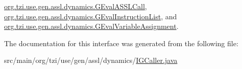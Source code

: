 \hyperlink{classorg_1_1tzi_1_1use_1_1gen_1_1assl_1_1dynamics_1_1_g_eval_a_s_s_l_call_a6857ffdf47efa524cc7c0e94216e22f2}{org.\-tzi.\-use.\-gen.\-assl.\-dynamics.\-G\-Eval\-A\-S\-S\-L\-Call}, \hyperlink{classorg_1_1tzi_1_1use_1_1gen_1_1assl_1_1dynamics_1_1_g_eval_instruction_list_abebe21912a627a5b600721a63763084b}{org.\-tzi.\-use.\-gen.\-assl.\-dynamics.\-G\-Eval\-Instruction\-List}, and \hyperlink{classorg_1_1tzi_1_1use_1_1gen_1_1assl_1_1dynamics_1_1_g_eval_variable_assignment_a6f44cdd570ff9473de8b2dd1b04d1941}{org.\-tzi.\-use.\-gen.\-assl.\-dynamics.\-G\-Eval\-Variable\-Assignment}.



The documentation for this interface was generated from the following file\-:\begin{DoxyCompactItemize}
\item 
src/main/org/tzi/use/gen/assl/dynamics/\hyperlink{_i_g_caller_8java}{I\-G\-Caller.\-java}\end{DoxyCompactItemize}
